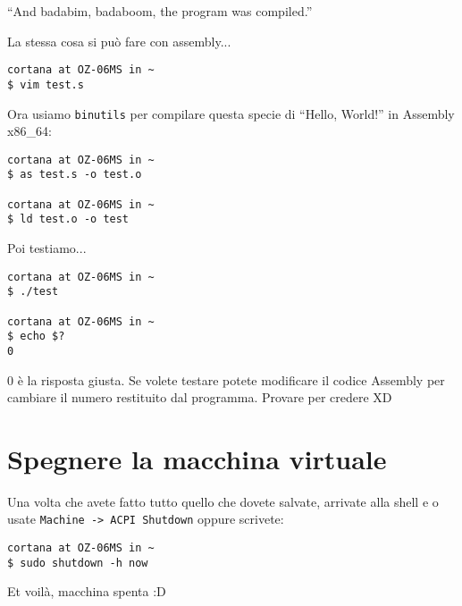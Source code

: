 \documentclass[a4paper]{memoir}
\begin{document}
		``And badabim, badaboom, the program was compiled.''
		
		La stessa cosa si può fare con assembly...
		
		\begin{Verbatim}[label={Holy Assembly, Batman!}]
cortana at OZ-06MS in ~
$ vim test.s
		\end{Verbatim}
		
		Ora usiamo \texttt{binutils} per compilare questa specie di ``Hello, World!'' in Assembly x86\_64:
		
		\begin{Verbatim}[label={Prima assembliamo, poi linkiamo...}]
cortana at OZ-06MS in ~
$ as test.s -o test.o

cortana at OZ-06MS in ~
$ ld test.o -o test
		\end{Verbatim}

		Poi testiamo...
		
		\begin{Verbatim}[label={Ma qualcuno li legge questi titoli?}]
cortana at OZ-06MS in ~
$ ./test

cortana at OZ-06MS in ~
$ echo $?
0
		\end{Verbatim}
		0 è la risposta giusta. Se volete testare potete modificare il codice Assembly per cambiare il numero
		restituito dal programma. Provare per credere XD
		
	\section{Spegnere la macchina virtuale}
		
		Una volta che avete fatto tutto quello che dovete salvate, arrivate alla shell e o usate \texttt{Machine -> ACPI Shutdown}
		oppure scrivete:
		
		\begin{Verbatim}[label={Ma qualcuno li legge questi titoli?}]
cortana at OZ-06MS in ~
$ sudo shutdown -h now
		\end{Verbatim}

		Et voilà, macchina spenta :D
\end{document}
